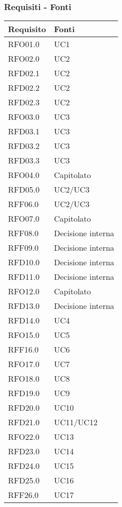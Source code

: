 \subsubsection{Requisiti - Fonti}
{
    \setlength{\freewidth}{\dimexpr\textwidth-8\tabcolsep}
    \renewcommand{\arraystretch}{1.5}
    \centering
    \setlength{\aboverulesep}{0pt}
    \setlength{\belowrulesep}{0pt}
    \begin{longtable}{C{.50\freewidth} C{.50\freewidth}}
        \toprule 
        \textbf{Requisito} & \textbf{Fonti} \\
        \toprule
        \endhead

        RFO01.0  & UC1 \\
        RFO02.0  & UC2 \\
        RFD02.1  & UC2 \\
        RFD02.2  & UC2 \\
        RFD02.3  & UC2 \\
        RFO03.0  & UC3 \\
        RFD03.1  & UC3 \\
        RFD03.2  & UC3 \\
        RFD03.3  & UC3 \\
        RFO04.0  & Capitolato \\
        RFD05.0  & UC2/UC3 \\
        RFF06.0  & UC2/UC3 \\
        RFO07.0  & Capitolato \\
        RFF08.0  & Decisione interna \\
        RFF09.0  & Decisione interna \\
        RFD10.0  & Decisione interna \\
        RFD11.0  & Decisione interna \\
        RFO12.0  & Capitolato \\
        RFD13.0  & Decisione interna \\

        RFD14.0  & UC4 \\
        RFO15.0  & UC5 \\
        RFF16.0  & UC6 \\
        RFO17.0  & UC7 \\
        RFO18.0  & UC8 \\
        RFD19.0  & UC9 \\
        RFD20.0  & UC10 \\
        RFD21.0  & UC11/UC12 \\
        RFO22.0  & UC13 \\
        RFD23.0  & UC14 \\
        RFD24.0  & UC15 \\
        RFD25.0  & UC16 \\
        RFF26.0  & UC17 \\


\end{longtable}}

